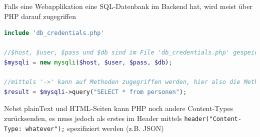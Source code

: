 \documentclass[a4paper, 11pt]{article}
\newcommand{\code}[1]{\texttt{#1}}
\begin{document}
\noindent Falls eine Webapplikation eine SQL-Datenbank im Backend hat, wird meist über PHP darauf zugegriffen

\begin{lstlisting}[language=php]
include 'db_credentials.php'

//$host, $user, $pass und $db sind im File 'db_credentials.php' gespeichert
$mysqli = new mysqli($host, $user, $pass, $db);

//mittels '->' kann auf Methoden zugegriffen werden, hier also die Methode 'query' vom mysqli-Objekt
$result = $mysqli->query("SELECT * from personen");

\end{lstlisting}

Nebst plainText und HTML-Seiten kann PHP noch andere Content-Types zurücksenden, es muss jedoch als erstes im Header mittels \code{header("Content-Type: whatever");} spezifiziert werden (z.B. JSON)
\end{document}
